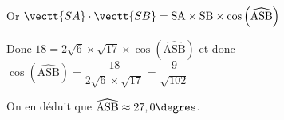 \begin{enumerate}
\begin{enumerate}
Or $\vectt{SA}\cdot \vectt{SB} = \text{SA}\times \text{SB}\times \cos \left ( \widehat{\text{ASB}}\right )$

Donc $18 = 2\sqrt{6} \times \sqrt{17} \times \cos \left ( \widehat{\text{ASB}}\right )$
et donc
$\cos \left ( \widehat{\text{ASB}}\right ) = \dfrac{18}{2\sqrt{6} \times \sqrt{17}}
= \dfrac{9}{\sqrt{102}}$

On en déduit que $\widehat{\text{ASB}} \approx 27,0\degres$.

	\end{enumerate}
\end{enumerate}

\bigskip
